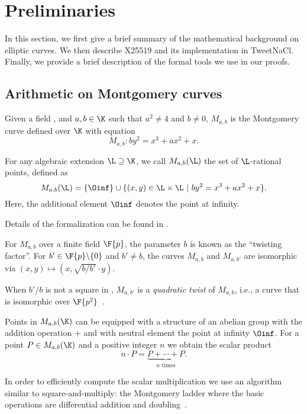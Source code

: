 \section{Preliminaries}
\label{sec:preliminaries}

In this section, we first give a brief summary of the mathematical background
on elliptic curves. We then describe X25519 and its implementation in TweetNaCl.
Finally, we provide a brief description of the formal tools we use in our proofs.


\subsection{Arithmetic on Montgomery curves}
\label{subsec:arithmetic-montgomery}

\begin{dfn}
  Given a field \K, and $a,b \in \K$ such that $a^2 \neq 4$ and $b \neq 0$,
  $M_{a,b}$ is the Montgomery curve defined over $\K$ with equation
  $$M_{a,b}: by^2 = x^3 + ax^2 + x.$$
\end{dfn}

\begin{dfn}
  For any algebraic extension $\L \supseteq	\K$, we call
  $M_{a,b}(\L)$ the set of $\L$-rational points, defined as
  $$M_{a,b}(\L) = \{\Oinf\} \cup \{(x,y) \in \L \times \L~|~by^2 = x^3 + ax^2 + x\}.$$
  Here, the additional element $\Oinf$ denotes the point at infinity.
\end{dfn}
Details of the formalization can be found in .


For $M_{a,b}$ over a finite field $\F{p}$, the parameter $b$ is known as the ``twisting factor''.
For $b'\in \F{p}\backslash\{0\}$ and $b' \neq b$, the curves $M_{a,b}$ and $M_{a,b'}$
are isomorphic via $(x,y) \mapsto (x, \sqrt{b/b'} \cdot y)$.

\begin{dfn}
  When $b'/b$ is not a square in , $M_{a,b'}$ is a \emph{quadratic twist} of $M_{a,b}$, i.e.,
  a curve that is isomorphic over $\F{p^2}$~\cite{cryptoeprint:2017:212}.
\end{dfn}

Points in $M_{a,b}(\K)$ can be equipped with a structure of an abelian group
with the addition operation $+$ and with neutral element the point at infinity $\Oinf$.
For a point $P \in M_{a,b}(\K)$ and a positive integer $n$ we obtain the scalar product
  $$n\cdot P = \underbrace{P + \cdots + P}_{n\text{ times}}.$$

In order to efficiently compute the scalar multiplication we use an algorithm
similar to square-and-multiply: the Montgomery ladder where the basic operations
are differential addition and doubling~\cite{MontgomerySpeeding}.

